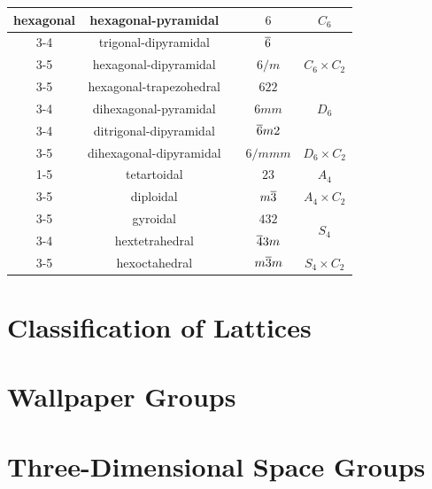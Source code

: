 \begin{center}
\begin{tabular}{c|c|cc|c}
		\multirow{7}{*}{hexagonal} & hexagonal-pyramidal & & $6$ & \multirow{2}{*}{$C_6$}\\\cline{3-4}
		& trigonal-dipyramidal & & $\overline{{6}}$ &\\\cline{3-5}
		& hexagonal-dipyramidal & &$6/m$ & $C_6 \times C_2$\\\cline{3-5}
		& hexagonal-trapezohedral & & $622$ & \multirow{3}{*}{$D_6$}\\\cline{3-4}
		& dihexagonal-pyramidal & & $6mm$ &\\\cline{3-4}
		& ditrigonal-dipyramidal & & $\overline{{6}} m 2$\\\cline{3-5}
		& dihexagonal-dipyramidal & & $6/mmm$ & $D_6 \times C_2$\\\cline{1-5}
		\multirow{5}{*}{cubic} & tetartoidal & & $23$ & $A_4$\\\cline{3-5}
		& diploidal & & $m\overline{{3}}$ & $A_4 \times C_2$\\\cline{3-5}
		& gyroidal & & $432$ & \multirow{2}{*}{$S_4$}\\\cline{3-4}
		& hextetrahedral & & $\overline{{4}} 3 m$ &\\\cline{3-5}
		& hexoctahedral & & $m \overline{{3}} m$ & $S_4 \times C_2$\\
	\end{tabular}
\end{center}
\section{Classification of Lattices}
\section{Wallpaper Groups}
\section{Three-Dimensional Space Groups}